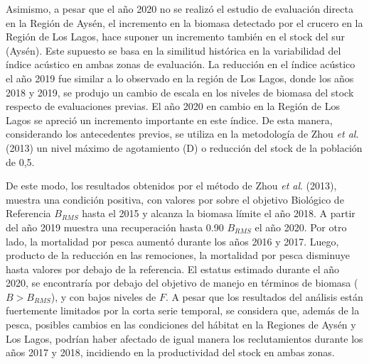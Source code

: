\documentclass[
  spanish,
]{article}
\begin{document}
Asimismo, a pesar que el año 2020 no se realizó el estudio de evaluación
directa en la Región de Aysén, el incremento en la biomasa detectado por
el crucero en la Región de Los Lagos, hace suponer un incremento también
en el stock del sur (Aysén). Este supuesto se basa en la similitud
histórica en la variabilidad del índice acústico en ambas zonas de
evaluación. La reducción en el índice acústico el año 2019 fue similar a
lo observado en la región de Los Lagos, donde los años 2018 y 2019, se
produjo un cambio de escala en los niveles de biomasa del stock respecto
de evaluaciones previas. El año 2020 en cambio en la Región de Los Lagos
se apreció un incremento importante en este índice. De esta manera,
considerando los antecedentes previos, se utiliza en la metodología de
Zhou \emph{et al}. (2013) un nivel máximo de agotamiento (D) o reducción
del stock de la población de 0,5.

De este modo, los resultados obtenidos por el método de Zhou \emph{et
al}. (2013), muestra una condición positiva, con valores por sobre el
objetivo Biológico de Referencia \(B_{RMS}\) hasta el 2015 y alcanza la
biomasa límite el año 2018. A partir del año 2019 muestra una
recuperación hasta 0.90 \(B_{RMS}\) el año 2020. Por otro lado, la
mortalidad por pesca aumentó durante los años 2016 y 2017. Luego,
producto de la reducción en las remociones, la mortalidad por pesca
disminuye hasta valores por debajo de la referencia. El estatus estimado
durante el año 2020, se encontraría por debajo del objetivo de manejo en
términos de biomasa (\(B>B_{RMS}\)), y con bajos niveles de \(F\). A
pesar que los resultados del análisis están fuertemente limitados por la
corta serie temporal, se considera que, además de la pesca, posibles
cambios en las condiciones del hábitat en la Regiones de Aysén y Los
Lagos, podrían haber afectado de igual manera los reclutamientos durante
los años 2017 y 2018, incidiendo en la productividad del stock en ambas
zonas.
\end{document}
